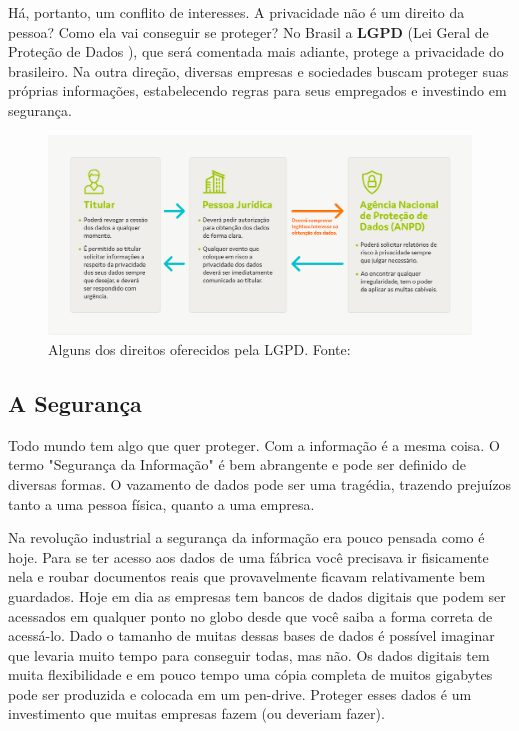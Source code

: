 Há, portanto, um conflito de interesses. A privacidade não é um direito da pessoa? Como ela vai conseguir se proteger? No Brasil a \textbf{LGPD} (Lei Geral de Proteção de Dados \cite{lgpd}), que será comentada mais adiante, protege a privacidade do brasileiro. Na outra direção, diversas empresas e sociedades buscam proteger suas próprias informações, estabelecendo regras para seus empregados e investindo em segurança.

\begin{figure}[htb]
    \centering
    \includegraphics[width=\textwidth]{img/lgpd.png}
    \caption{Alguns dos direitos oferecidos pela LGPD. Fonte: \cite{senior}}
    \label{fig:lgpddireitos}
\end{figure}

\subsection{A Segurança}

Todo mundo tem algo que quer proteger. Com a informação é a mesma coisa. O termo "Segurança da Informação" é bem abrangente e pode ser definido de diversas formas. O vazamento de dados pode ser uma tragédia, trazendo prejuízos tanto a uma pessoa física, quanto a uma empresa.

Na revolução industrial a segurança da informação era pouco pensada como é hoje. Para se ter acesso aos dados de uma fábrica você precisava ir fisicamente nela e roubar documentos reais que provavelmente ficavam relativamente bem guardados. Hoje em dia as empresas tem bancos de dados digitais que podem ser acessados em qualquer ponto no globo desde que você saiba a forma correta de acessá-lo. Dado o tamanho de muitas dessas bases de dados é possível imaginar que levaria muito tempo para conseguir todas, mas não. Os dados digitais tem muita flexibilidade e em pouco tempo uma cópia completa de muitos gigabytes pode ser produzida e colocada em um pen-drive. Proteger esses dados é um investimento que muitas empresas fazem (ou deveriam fazer).

